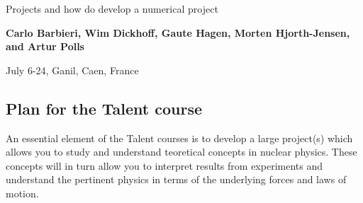 \documentclass[%
twoside,                 %
final,                   %
10pt]{article}
\begin{document}






\thispagestyle{empty}

\begin{center}
{\LARGE\bf
\begin{spacing}{1.25}
Projects and how do develop a numerical project
\end{spacing}
}
\end{center}


\begin{center}
{\bf Carlo Barbieri, Wim Dickhoff, Gaute Hagen, Morten Hjorth-Jensen, and Artur Polls${}^{}$} \\ [0mm]
\end{center}

    \begin{center}
\end{center}
    

\begin{center} %
July 6-24, Ganil, Caen, France
\end{center}

\vspace{1cm}


\tableofcontents


\vspace{1cm} %




\subsection*{Plan for the Talent course}
An essential element of the Talent courses is to develop a large project(s) which allows you to study and understand
teoretical concepts in nuclear physics.  
These concepts will in turn allow you to interpret results from experiments and understand the pertinent physics in terms of the underlying forces and laws of motion.
\end{document}
